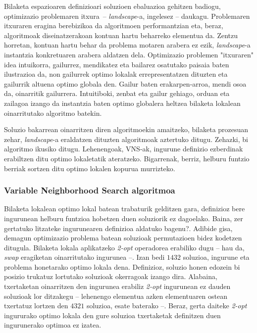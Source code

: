 \documentclass[eu]{ifirak}\usepackage[]{graphicx}\usepackage[]{color}
\newcommand{\zkk}{\guillemotleft}
\newcommand{\skk}{\guillemotright}
\begin{document}
Bilaketa espazioaren definizioari soluzioen ebaluazioa gehitzen badiogu, optimizazio problemaren \zkk itxura\skk\ -- \textit{landscape}-a, ingelesez -- daukagu. Problemaren itxuraren eragina berebizikoa da algoritmoen performantzian eta, beraz, algoritmoak diseinatzerakoan kontuan hartu beharreko elementua da. Zentzu horretan, kontuan hartu behar da problema motaren arabera ez ezik, \textit{landscape}-a  instantzia konkretuaren arabera aldatzen dela. Optimizazio problemen "itxuraren" idea intuikorra, gailurrez, mendikatez eta bailarez osatutako paisaia baten ilustrazioa da, non gailurrek optimo lokalak errepresentatzen dituzten eta gailurrik altuena optimo globala den. Gailur baten erakarpen-arroa, mendi osoa da, oinarritik gailurrera. Intuitiboki, zenbat eta gailur gehiago, orduan eta zailagoa izango da instantzia baten optimo globalera heltzea bilaketa lokalean oinarritutako algoritmo batekin.

Soluzio bakarrean oinarritzen diren algoritmoekin amaitzeko, bilaketa prozesuan zehar, \textit{landscape}-a eraldatzen dituzten algoritmoak aztertuko ditugu. Zehazki, bi algoritmo ikusiko ditugu. Lehenengoak, VNS-ak, ingurune definizio ezberdinak erabiltzen ditu optimo lokaletatik ateratzeko. Bigarrenak, berriz, helburu funtzio berriak sortzen ditu optimo lokalen kopurua murrizteko.

\subsubsection{Variable Neighborhood Search algoritmoa}

Bilaketa lokalean optimo lokal batean trabaturik gelditzen gara, definizioz bere ingurunean helburu funtzioa hobetzen duen soluziorik ez dagoelako. Baina, zer gertatuko litzateke ingurunearen definizioa aldatuko bagenu?. Adibide gisa, demagun optimizazio problema batean soluzioak permutazioen bidez kodetzen ditugula. Bilaketa lokala aplikatzeko \textit{2-opt} operadorea erabiliko dugu -- hau da, \textit{swap} eragiketan oinarritutako ingurunea --. Izan bedi $1432$ soluzioa, ingurune eta problema honetarako optimo lokala dena. Definizioz, soluzio honen edozein bi posizio trukatuz lortutako soluzioak okerragoak izango dira. Alabaina, txertaketan oinarritzen den ingurunea erabiliz \textit{2-opt} ingurunean ez dauden soluzioak lor ditzakegu -- lehenengo elementua azken elementuaren ostean txertatuz lortzen den $4321$ soluzioa, esate baterako --. Beraz, gerta daiteke \textit{2-opt} ingururako optimo lokala den gure soluzioa txertaketak definitzen duen ingurunerako optimoa ez izatea.
\end{document}
